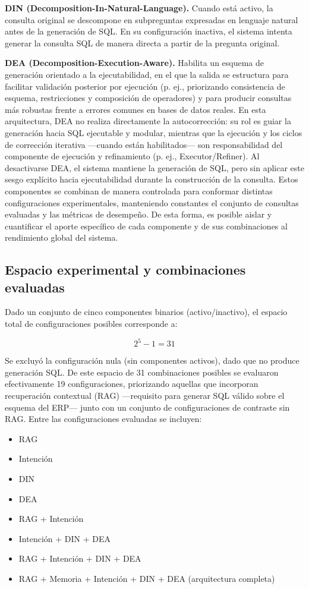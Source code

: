 \documentclass[journal]{IEEEtran}
\begin{document}
\textbf{DIN (Decomposition-In-Natural-Language).} Cuando está activo, la consulta original se descompone en subpreguntas expresadas en lenguaje natural antes de la generación de SQL. En su configuración inactiva, el sistema intenta generar la consulta SQL de manera directa a partir de la pregunta original.

\textbf{DEA (Decomposition-Execution-Aware).} Habilita un esquema de generación orientado a la ejecutabilidad, en el que la salida se estructura para facilitar validación posterior por ejecución (p. ej., priorizando consistencia de esquema, restricciones y composición de operadores) y para producir consultas más robustas frente a errores comunes en bases de datos reales. En esta arquitectura, DEA no realiza directamente la autocorrección: su rol es guiar la generación hacia SQL ejecutable y modular, mientras que la ejecución y los ciclos de corrección iterativa —cuando están habilitados— son responsabilidad del componente de ejecución y refinamiento (p. ej., Executor/Refiner). Al desactivarse DEA, el sistema mantiene la generación de SQL, pero sin aplicar este sesgo explícito hacia ejecutabilidad durante la construcción de la consulta.
Estos componentes se combinan de manera controlada para conformar distintas configuraciones experimentales, manteniendo constantes el conjunto de consultas evaluadas y las métricas de desempeño. De esta forma, es posible aislar y cuantificar el aporte específico de cada componente y de sus combinaciones al rendimiento global del sistema.

\subsection{Espacio experimental y combinaciones evaluadas}

Dado un conjunto de cinco componentes binarios (activo/inactivo), el espacio total de configuraciones posibles corresponde a:

$$2^5 - 1 = 31$$

Se excluyó la configuración nula (sin componentes activos), dado que no produce generación SQL. De este espacio de 31 combinaciones posibles se evaluaron efectivamente 19 configuraciones, priorizando aquellas que incorporan recuperación contextual (RAG) —requisito para generar SQL válido sobre el esquema del ERP— junto con un conjunto de configuraciones de contraste sin RAG. Entre las configuraciones evaluadas se incluyen:

\begin{itemize}
	\item RAG
	\item Intención
	\item DIN
	\item DEA
	\item RAG + Intención
	\item Intención + DIN + DEA
	\item RAG + Intención + DIN + DEA
	\item RAG + Memoria + Intención + DIN + DEA (arquitectura completa)
\end{itemize}
\end{document}
